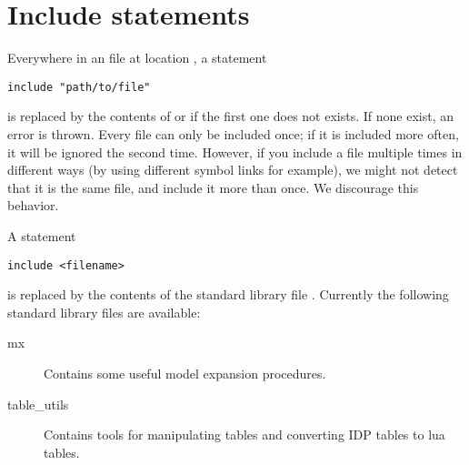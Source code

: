 \section{Include statements}
Everywhere in an \idp file at location , a statement 
\begin{lstlisting}
include "path/to/file"
\end{lstlisting}
is replaced by the contents of  or  if the first one does not exists. 
If none exist, an error is thrown.
Every file can only be included once; if it is included more often, it will be ignored the second time.
However, if you include a file multiple times in different ways (by using different symbol links for example), we might not detect that it is the same file, and include it more than once.
We discourage this behavior.


A statement
\begin{lstlisting}
include <filename>
\end{lstlisting}
is replaced by the contents of the standard library file .
Currently the following standard library files are available:
\begin{description}
\item[mx] Contains some useful model expansion procedures.
\item[table\_utils] Contains tools for manipulating tables and converting IDP tables to lua tables.
\end{description}
